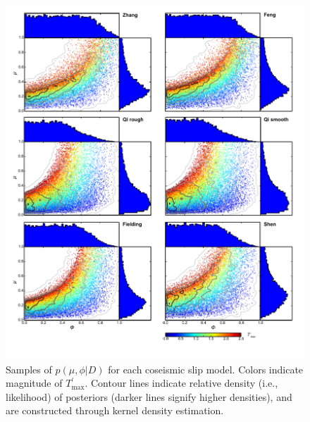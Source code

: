 \documentclass[draft,jgrga]{AGUTeX}
\begin{document}
\begin{figure}[htbp]
\centering
\includegraphics[width=40pc]{../figures/mu_phi_fms.pdf}
\caption{Samples of $p(\mu,\phi | D)$ for each coseismic slip model.
Colors indicate magnitude of $T^\prime_{\mathrm{max}}$. Contour lines
indicate relative density (i.e., likelihood) of posteriors (darker lines
signify higher densities), and are constructed through kernel density
estimation.}
\label{fig:mu_phi_scatters}
\end{figure}
\end{document}
